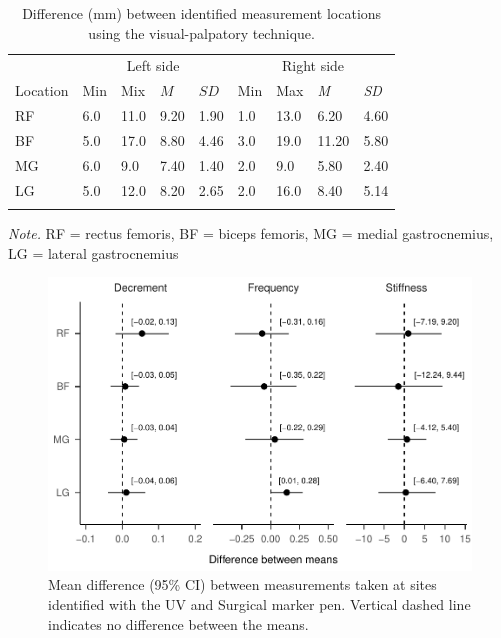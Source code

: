 \documentclass[
  english,
  man,floatsintext]{apa6}
\begin{document}
\begin{table}[H]

\begin{center}
\begin{threeparttable}

\caption{\label{tab:differences}Difference (mm) between identified measurement locations using the visual-palpatory technique.}

\begin{tabular}{lllllllll}
\toprule
 & \multicolumn{4}{c}{Left side} & \multicolumn{4}{c}{Right side} \\
\cmidrule(r){2-5} \cmidrule(r){6-9}
Location & Min & Mix & $M$ & $SD$ & Min & Max & \textit{M} & \textit{SD}\\
\midrule
RF & 6.0 & 11.0 & 9.20 & 1.90 & 1.0 & 13.0 & 6.20 & 4.60\\
BF & 5.0 & 17.0 & 8.80 & 4.46 & 3.0 & 19.0 & 11.20 & 5.80\\
MG & 6.0 & 9.0 & 7.40 & 1.40 & 2.0 & 9.0 & 5.80 & 2.40\\
LG & 5.0 & 12.0 & 8.20 & 2.65 & 2.0 & 16.0 & 8.40 & 5.14\\
\bottomrule
\addlinespace
\end{tabular}

\begin{tablenotes}[para]
\normalsize{\textit{Note.} RF = rectus femoris, BF = biceps femoris, MG = medial gastrocnemius, LG = lateral gastrocnemius}
\end{tablenotes}

\end{threeparttable}
\end{center}

\end{table}

\begin{figure}[H]

{\centering \includegraphics{full_phd_files/figure-latex/forrestplot-1} 

}

\caption{Mean difference (95\% CI) between measurements taken at sites identified with the UV and Surgical marker pen. Vertical dashed line indicates no difference between the means.}\label{fig:forrestplot}
\end{figure}
\end{document}
